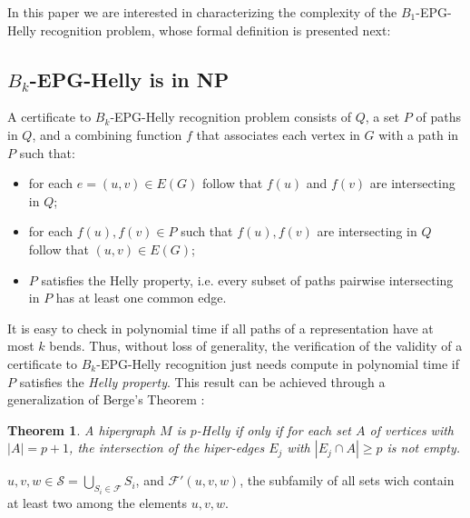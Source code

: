 \documentclass[a4paper,11pt]{article}
\newtheorem{theorem}{Theorem}
\begin{document}
In this paper we are interested in characterizing the complexity of the $B_1$-EPG-Helly recognition problem, whose formal definition is presented next:




\subsection{$B_k$-EPG-Helly is in NP}

A certificate to {\sc $B_k$-EPG-Helly recognition} problem consists of $Q$, a set $P$ of paths in $Q$, and a combining function $f$ that associates each vertex in $G$ with a path  in $P$ such that:

\begin{itemize}
\item for each $e=(u,v) \in E(G)$ follow that $f(u)$ and $f(v)$ are intersecting in $Q$;
\item for each $f(u),f(v) \in P$ such that $f(u),f(v)$ are intersecting in $Q$ follow that $(u,v) \in E(G)$;
\item $P$ satisfies the Helly property, i.e. every subset of paths pairwise intersecting in $P$ has at least one common edge.
\end{itemize}

It is easy to check in polynomial time if all paths of a representation have at most $k$ bends. Thus, without loss of generality, the verification of the validity of a certificate to $B_k$-EPG-Helly recognition just needs compute in polynomial time if $ P $ satisfies the  \textit{Helly property}. This result can be achieved through a generalization of Berge's Theorem \citep{bergeDuchet1975}:

\begin{theorem} \citep{bergeDuchet1975} A hipergraph $M$ is $p$-Helly  if only if for each set $A$ of vertices with $|A| = p+1$, the intersection of the hiper-edges $E_j$ with $|E_j \cap A|\geq p$ is not empty. 
\end{theorem}


$ \displaystyle  u,v,w \in \mathcal{S} = \bigcup _{S_i \in \mathcal{F}} S_i$, and $\mathcal{F'}(u,v,w)$, the subfamily of all sets wich contain at least two among the elements $u,v,w$. 
\end{document}
